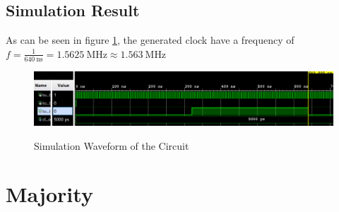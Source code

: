 \documentclass{article}
\begin{document}
\subsection*{Simulation Result}
As can be seen in figure \ref{fig:3}, the generated clock have a frequency of $f=\frac{1}{\SI{640}{\nano\second}}=\SI{1.5625}{\mega\hertz}\approx\SI{1.563}{\mega\hertz}$
\begin{figure}[H]
  \centering
  \caption{Simulation Waveform of the Circuit}
  \includegraphics[width=\textwidth]{ECE4304_Midterm1_3_sim.png}
  \label{fig:3}
\end{figure}

\newpage

\section{Majority}
\end{document}

